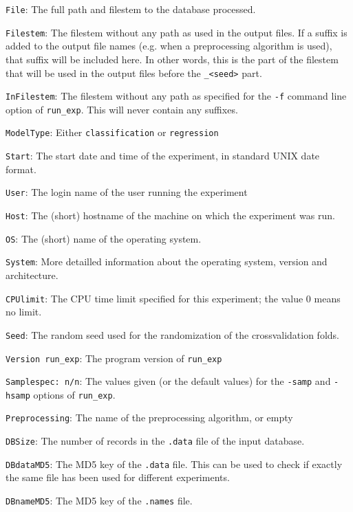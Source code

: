 \documentclass[a4paper,10pt,twoside]{article}
\newenvironment{optionlist}
{\begin{list}{}
    {\setlength{\itemsep}{0em plus0em minus0ex}
      \setlength{\parsep}{0ex}
      \setlength{\topsep}{0em}
      \setlength{\leftmargin}{2em}
      \setlength{\listparindent}{0em}
      \setlength{\itemindent}{-2em}
      \setlength{\partopsep}{0ex}
    }}
  {\end{list}}
\begin{document}
\begin{optionlist}
\item \verb=File=: The full path and filestem to the database processed.
\item \verb=Filestem=: The filestem without any path as used in the output
  files. If a suffix is added to the output file names (e.g. when
  a preprocessing algorithm is used), that suffix will be included here.
  In other words, this is the part of the filestem that will be used
  in the output files before the \verb=_<seed>= part.
\item \verb=InFilestem=: The filestem without any path as specified
  for the \verb=-f= command line option of \verb=run_exp=. This will 
  never contain any suffixes.
\item \verb=ModelType=: Either \verb=classification= or \verb=regression=
\item \verb=Start=: The start date and time of the experiment, in standard UNIX date format.
\item \verb=User=: The login name of the user running the experiment
\item \verb=Host=: The (short) hostname of the machine on which the 
experiment was run.
\item \verb=OS=: The (short) name of the operating system.
\item \verb=System=: More detailled information about the operating 
system, version and architecture.
\item \verb=CPUlimit=: The CPU time limit specified for this experiment; the
value 0 means no limit.
\item \verb=Seed=: The random seed used for the randomization of the
crossvalidation folds.
\item \verb=Version run_exp=: The program version of \verb=run_exp= 
\item \verb=Samplespec: n/n=: The values given (or the default values) for 
the \texttt{-samp} and \texttt{-hsamp} options of \verb=run_exp=.
\item \verb=Preprocessing=: The name of the preprocessing algorithm, or empty
\item \verb=DBSize=: The number of records in the \texttt{.data} file of the 
input database.
\item \verb=DBdataMD5=: The MD5 key of the \texttt{.data} file.
This can be used to check if exactly the same file has been used for
different experiments.
\item \verb=DBnameMD5=: The MD5 key of the \texttt{.names} file.

\end{optionlist}
\end{document}
